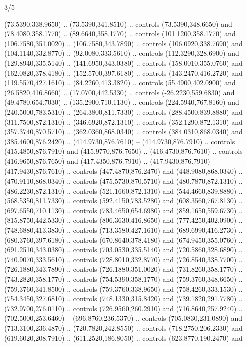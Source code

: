 \begin{flagdescription}{3/5}
\begin{scope} [xshift=0.5\flagwidth*\stretchfactor,yshift=0.5\flagwidth,scale=\flagwidth/391]
\begin{scope}[y=0.8pt, x=0.8pt, yscale=-1, xscale=1,line width=0.01\lw,shift={(-98.875,-338.125)}]
\begin{scope}[cm={{0.15382,0.0,0.0,0.15382,(34.72393,273.11413)}}]
\begin{scope}[draw=black,line join=round,line cap=round]
  (73.5390,338.9650) .. (73.5390,341.8510) .. controls (73.5390,348.6650) and
  (78.4080,358.1770) .. (89.6640,358.1770) .. controls (101.1200,358.1770) and
  (106.7580,351.0020) .. (106.7580,343.7890) .. controls (106.0920,338.7690) and
  (104.1140,332.8770) .. (92.0080,333.5610) .. controls (112.3290,328.6900) and
  (129.8940,335.5140) .. (141.6950,343.0380) .. controls (158.0010,355.0760) and
  (162.0820,378.4180) .. (152.5700,397.6180) .. controls (143.2470,416.2720) and
  (119.5570,427.1610) .. (84.2260,413.3820) .. controls (55.4900,402.0900) and
  (26.5820,416.8660) .. (17.0700,442.5330) .. controls (-26.2230,559.6830) and
  (49.4780,654.7030) .. (135.2900,710.1130) .. controls (224.5940,767.8160) and
  (240.5000,783.5310) .. (264.3800,811.7330) .. controls (288.4500,839.8880) and
  (311.7500,872.1310) .. (346.6920,872.1310) .. controls (352.1290,872.1310) and
  (357.3740,870.5710) .. (362.0360,868.0340) .. controls (384.0310,868.0340) and
  (385.4600,876.2420) .. (414.9730,876.7610) -- (414.9730,876.7910) .. controls
  (415.4850,876.7910) and (415.9770,876.7650) .. (416.4730,876.7610) .. controls
  (416.9650,876.7650) and (417.4350,876.7910) .. (417.9430,876.7910) --
  (417.9430,876.7610) .. controls (447.4870,876.2470) and (448.9080,868.0340) ..
  (470.9110,868.0340) .. controls (475.5730,870.5710) and (480.7870,872.1310) ..
  (486.2230,872.1310) .. controls (521.1660,872.1310) and (544.4660,839.8880) ..
  (568.5350,811.7330) .. controls (592.4150,783.5280) and (608.3560,767.8130) ..
  (697.6550,710.1130) .. controls (783.4650,654.6980) and (859.1650,559.6730) ..
  (815.8750,442.5330) .. controls (806.3630,416.8650) and (777.4250,402.0900) ..
  (748.6880,413.3830) .. controls (713.3580,427.1610) and (689.6990,416.2730) ..
  (680.3760,397.6180) .. controls (670.8640,378.4180) and (674.9450,355.0760) ..
  (691.2510,343.0380) .. controls (703.0530,335.5140) and (720.5860,328.6890) ..
  (740.9070,333.5610) .. controls (728.8010,332.8770) and (726.8540,338.7700) ..
  (726.1880,343.7890) .. controls (726.1880,351.0020) and (731.8260,358.1770) ..
  (743.2820,358.1770) .. controls (754.5390,358.1770) and (759.3760,348.6650) ..
  (759.3760,341.8500) .. controls (759.3760,338.9650) and (758.4260,333.1530) ..
  (754.3450,327.6810) .. controls (748.1330,315.8420) and (739.1820,291.7780) ..
  (732.9700,276.0110) .. controls (726.9560,260.2910) and (716.8640,257.9240) ..
  (702.5000,253.6460) -- (696.8760,236.5370) .. controls (705.0830,231.0890) and
  (713.3100,236.4870) .. (720.7820,242.8550) .. controls (718.2750,206.2330) and
  (619.6020,208.7910) .. (611.2520,186.8050) .. controls (623.8770,190.2470) and

\end{scope}
\end{scope}
\end{scope}
\end{scope}
\end{flagdescription}
